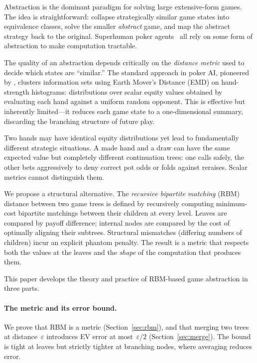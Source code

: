 \documentclass[11pt]{article}
\begin{document}
Abstraction is the dominant paradigm for solving large extensive-form
games. The idea is straightforward: collapse strategically similar game
states into equivalence classes, solve the smaller \emph{abstract} game,
and map the abstract strategy back to the original.  Superhuman poker
agents~\citep{bowling2015solving,moravvcik2017deepstack,brown2018superhuman}
all rely on some form of abstraction to make computation tractable.

The quality of an abstraction depends critically on the \emph{distance
metric} used to decide which states are ``similar.'' The standard
approach in poker AI, pioneered by \citet{gilpin2007potential}, clusters
information sets using Earth Mover's Distance (EMD) on hand-strength
histograms: distributions over scalar equity values obtained by
evaluating each hand against a uniform random opponent. This is
effective but inherently limited---it reduces each game state to a
one-dimensional summary, discarding the branching structure of future
play.

Two hands may have identical equity distributions yet lead to
fundamentally different strategic situations. A made hand and a draw can
have the same expected value but completely different continuation trees:
one calls safely, the other bets aggressively to deny correct pot odds
or folds against reraises. Scalar metrics cannot distinguish them.

We propose a structural alternative. The \emph{recursive bipartite
matching} (RBM) distance between two game trees is defined by
recursively computing minimum-cost bipartite matchings between their
children at every level. Leaves are compared by payoff difference;
internal nodes are compared by the cost of optimally aligning their
subtrees. Structural mismatches (differing numbers of children) incur an
explicit phantom penalty. The result is a metric that respects both the
values at the leaves and the \emph{shape} of the computation that
produces them.

This paper develops the theory and practice of RBM-based game
abstraction in three parts.

\paragraph{The metric and its error bound.}  We prove that RBM is a
metric (Section~\ref{sec:rbm}), and that merging two trees at
distance~$\varepsilon$ introduces EV error at most~$\varepsilon/2$
(Section~\ref{sec:merge}). The bound is tight at leaves but strictly
tighter at branching nodes, where averaging reduces error.
\end{document}
